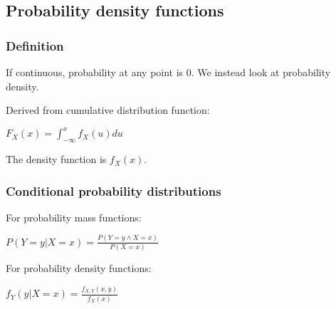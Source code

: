 
\subsection{Probability density functions}

\subsubsection{Definition}

If continuous, probability at any point is \(0\). We instead look at probability density.

Derived from cumulative distribution function:

$F_X(x)=\int_{-\infty}^x f_X(u)du$

The density function is \(f_X(x)\).

\subsubsection{Conditional probability distributions}

For probability mass functions:

$P(Y=y|X=x)=\frac{P(Y=y\land X=x)}{P(X=x)}$

For probability density functions:

$f_Y(y|X=x)=\frac{f_{X,Y}(x,y)}{f_X(x)}$

